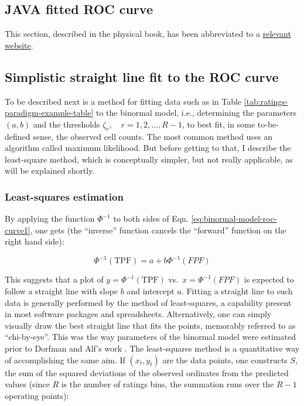 \documentclass[
]{book}
\begin{document}
\hypertarget{java-fitted-roc-curve}{%
\subsection{JAVA fitted ROC curve}\label{java-fitted-roc-curve}}

This section, described in the physical book, has been abbreviated to a \href{http://www.rad.jhmi.edu/jeng/javarad/roc/JROCFITi.html}{relevant website}.

\hypertarget{simplistic-straight-line-fit-to-the-roc-curve}{%
\subsection{Simplistic straight line fit to the ROC curve}\label{simplistic-straight-line-fit-to-the-roc-curve}}

To be described next is a method for fitting data such as in Table \ref{tab:ratings-paradigm-example-table} to the binormal model, i.e., determining the parameters \((a,b)\) and the thresholds \(\zeta_r , \quad r = 1, 2, ..., R-1\), to best fit, in some to-be-defined sense, the observed cell counts. The most common method uses an algorithm called maximum likelihood. But before getting to that, I describe the least-square method, which is conceptually simpler, but not really applicable, as will be explained shortly.

\hypertarget{least-squares-estimation}{%
\subsubsection{Least-squares estimation}\label{least-squares-estimation}}

By applying the function \(\Phi^{-1}\) to both sides of Eqn. \eqref{eq:binormal-model-roc-curve1}, one gets (the ``inverse'' function cancels the ``forward'' function on the right hand side):

\begin{equation*} 
\Phi^{-1}\left ( \text{TPF} \right ) = a + b \Phi^{-1}\left ( FPF \right )
\end{equation*}

This suggests that a plot of \(y = \Phi^{-1}\left ( \text{TPF} \right )\) vs.~\(x=\Phi^{-1}\left ( FPF \right )\) is expected to follow a straight line with slope \(b\) and intercept \(a\). Fitting a straight line to such data is generally performed by the method of least-squares, a capability present in most software packages and spreadsheets. Alternatively, one can simply visually draw the best straight line that fits the points, memorably referred to \citep{RN300} as ``chi-by-eye''. This was the way parameters of the binormal model were estimated prior to Dorfman and Alf's work \citep{dorfman1969maximum}. The least-squares method is a quantitative way of accomplishing the same aim. If \(\left ( x_t,y_t \right )\) are the data points, one constructs \(S\), the sum of the squared deviations of the observed ordinates from the predicted values (since \(R\) is the number of ratings bins, the summation runs over the \(R-1\) operating points):
\end{document}
